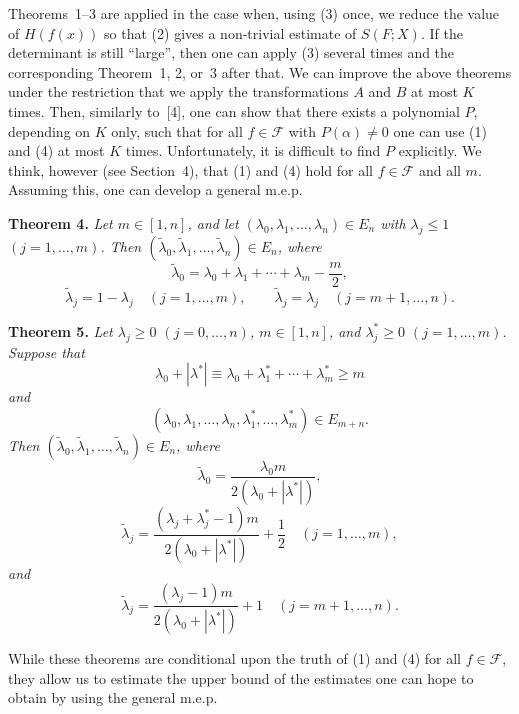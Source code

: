 \documentclass[10pt]{article}
\begin{document}
Theorems~1--3 are applied in the case when, using (3) once, we reduce the value of $H(f(x))$ so that (2) gives a non-trivial estimate of $S(F;X)$. If the determinant is still ``large'', then one can apply (3) several times and the corresponding Theorem~1, 2, or~3 after that. We can improve the above theorems under the restriction that we apply the transformations $A$ and $B$ at most $K$ times. Then, similarly to~[4], one can show that there exists a polynomial $P$, depending on $K$ only, such that for all $f\in\mathscr F$ with $P(\alpha)\ne0$ one can use (1) and (4) at most $K$ times. Unfortunately, it is difficult to find $P$ explicitly. We think, however (see Section~4), that (1) and (4) hold for all $f\in\mathscr F$ and all $m$. Assuming this, one can develop a general m.e.p.

\medskip
\noindent\textbf{Theorem 4.}
\textit{Let $m\in[1,n]$, and let $(\lambda_0,\lambda_1,\ldots,\lambda_n)\in E_n$ with $\lambda_j\leqslant1$ $(j=1,\ldots,m)$. Then $(\widetilde\lambda_0,\widetilde\lambda_1,\ldots,\widetilde\lambda_n)\in E_n$, where
\[
  \widetilde\lambda_0=\lambda_0+\lambda_1+\cdots+\lambda_m-\frac m2,
\]
\[
  \widetilde\lambda_j=1-\lambda_j\quad(j=1,\ldots,m),
  \qquad
  \widetilde\lambda_j=\lambda_j\quad(j=m+1,\ldots,n).
\]}

\medskip
\noindent\textbf{Theorem 5.}
\textit{Let $\lambda_j\geqslant0$ $(j=0,\ldots,n)$, $m\in[1,n]$, and $\lambda_j^*\geqslant0$ $(j=1,\ldots,m)$. Suppose that
\[
  \lambda_0+|\lambda^*|\equiv\lambda_0+\lambda_1^*+\cdots+\lambda_m^*\geqslant m
\]
and
\[
  (\lambda_0,\lambda_1,\ldots,\lambda_n,\lambda_1^*,\ldots,\lambda_m^*)\in E_{m+n}.
\]
Then $(\widetilde\lambda_0,\widetilde\lambda_1,\ldots,\widetilde\lambda_n)\in E_n$, where
\[
  \widetilde\lambda_0=\frac{\lambda_0m}{2(\lambda_0+|\lambda^*|)},
\]
\[
  \widetilde\lambda_j=
  \frac{(\lambda_j+\lambda_j^*-1)m}{2(\lambda_0+|\lambda^*|)}+\frac12
  \quad(j=1,\ldots,m),
\]
and
\[
  \widetilde\lambda_j=
  \frac{(\lambda_j-1)m}{2(\lambda_0+|\lambda^*|)}+1
  \quad(j=m+1,\ldots,n).
\]}

While these theorems are conditional upon the truth of (1) and (4) for all $f\in\mathscr F$, they allow us to estimate the upper bound of the estimates one can hope to obtain by using the general m.e.p.
\end{document}
